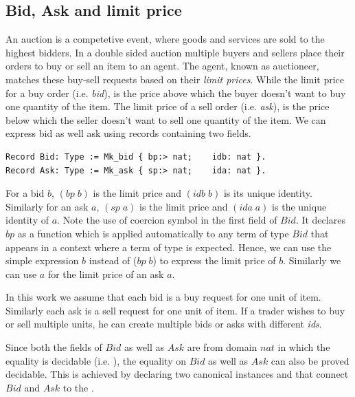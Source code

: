 \documentclass[a4paper,UKenglish,cleveref, autoref]{lipics-v2019}
\begin{document}
\subsection{Bid, Ask and limit price}
An auction is a competetive event, where goods and services are sold to the highest bidders. In  a double sided auction multiple buyers and sellers place their orders to buy or sell an item to an agent. The agent, known as auctioneer, matches these buy-sell requests  based on their \emph{limit prices}. While the limit price for a buy order (i.e. \emph{bid}), is the price above which the buyer doesn't want to buy one quantity of the item. The limit price of a sell order (i.e. \emph{ask}), is the price below which the seller doesn't want to sell one quantity of the item. We can express bid as well ask using  records containing two fields. 
\begin{verbatim}
Record Bid: Type := Mk_bid { bp:> nat;    idb: nat }.
Record Ask: Type := Mk_ask { sp:> nat;    ida: nat }.
\end{verbatim}
For a bid $b$, $(bp \; b)$  is the limit price and $(idb \; b)$ is its unique identity. Similarly for an ask $a$, $(sp \; a)$ is the limit price and $(ida \; a)$ is the unique identity of $a$. Note the use of coercion symbol \tw{ :>} in the first field of $Bid$. It declares $bp$ as a function which is applied automatically to any term of type $Bid$ that appears in a context where a term of type  is expected. Hence, we can use the simple expression $b$ instead of  ($bp \;b$) to express the limit price of $b$. Similarly we can use $a$ for the limit price of an ask $a$.
\begin{note*} In this work we assume that each bid is a buy request for one unit of item. Similarly each ask is a sell request for one unit of item. If a trader wishes to buy or sell multiple units, he can create multiple bids or asks with different \emph{ids}. 
\end{note*}

Since both the fields of $Bid$ as well as $Ask$ are from domain $nat$ in which the equality is decidable (i.e. ), the equality on $Bid$ as well as $Ask$ can also be proved  decidable. This is achieved by declaring two canonical instances  and  that connect $Bid$ and $Ask$ to the .  
\end{document}
